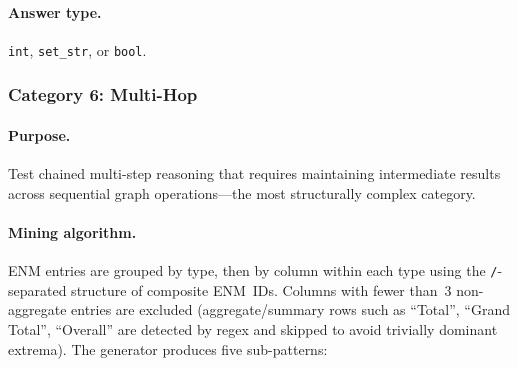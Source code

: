 \documentclass[11pt]{article}
\begin{document}
\paragraph{Answer type.} \texttt{int}, \texttt{set\_str}, or \texttt{bool}.

\subsubsection{Category 6: Multi-Hop}

\paragraph{Purpose.}  Test chained multi-step reasoning that requires
maintaining intermediate results across sequential graph operations---the
most structurally complex category.

\paragraph{Mining algorithm.}
ENM entries are grouped by type, then by column within each type using
the \texttt{/}-separated structure of composite ENM~IDs.  Columns with
fewer than~3 non-aggregate entries are excluded (aggregate/summary rows
such as ``Total'', ``Grand Total'', ``Overall'' are detected by regex
and skipped to avoid trivially dominant extrema).  The generator produces
five sub-patterns:
\end{document}
